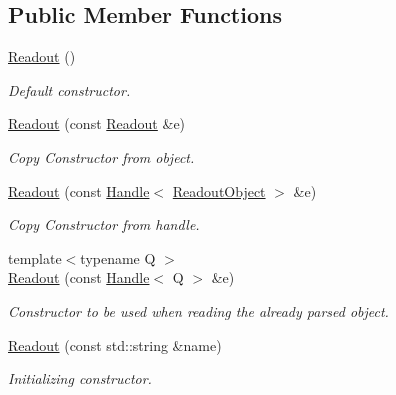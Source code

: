 \subsection*{Public Member Functions}
\begin{DoxyCompactItemize}
\item 
\hyperlink{class_d_d4hep_1_1_geometry_1_1_readout_a68a973b03f937589ab389eaaaa240087}{Readout} ()
\begin{DoxyCompactList}\small\item\em Default constructor. \item\end{DoxyCompactList}\item 
\hyperlink{class_d_d4hep_1_1_geometry_1_1_readout_a9c1a44f924f5a70eca44627569f56d21}{Readout} (const \hyperlink{class_d_d4hep_1_1_geometry_1_1_readout}{Readout} \&e)
\begin{DoxyCompactList}\small\item\em Copy Constructor from object. \item\end{DoxyCompactList}\item 
\hyperlink{class_d_d4hep_1_1_geometry_1_1_readout_a6bfb91ac432f9ee6ed1b08921188a87a}{Readout} (const \hyperlink{class_d_d4hep_1_1_handle}{Handle}$<$ \hyperlink{class_d_d4hep_1_1_geometry_1_1_readout_object}{ReadoutObject} $>$ \&e)
\begin{DoxyCompactList}\small\item\em Copy Constructor from handle. \item\end{DoxyCompactList}\item 
{\footnotesize template$<$typename Q $>$ }\\\hyperlink{class_d_d4hep_1_1_geometry_1_1_readout_a705069ce0237484eb95a9134df946698}{Readout} (const \hyperlink{class_d_d4hep_1_1_handle}{Handle}$<$ Q $>$ \&e)
\begin{DoxyCompactList}\small\item\em Constructor to be used when reading the already parsed object. \item\end{DoxyCompactList}\item 
\hyperlink{class_d_d4hep_1_1_geometry_1_1_readout_ad8822b93a8d52c61b848323a5cea203d}{Readout} (const std::string \&name)
\begin{DoxyCompactList}\small\item\em Initializing constructor. \item\end{DoxyCompactList}\item 

\end{DoxyCompactItemize}
